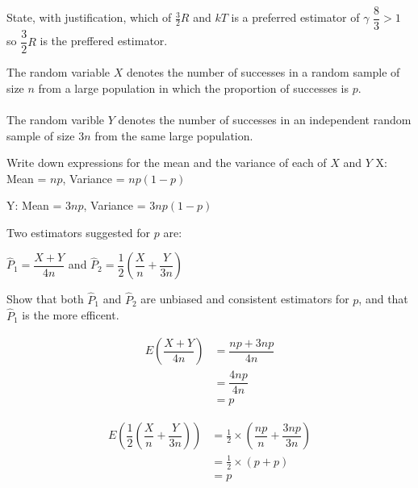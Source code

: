 \begin{example}
        \begin{step}{State, with justification, which of $\frac{3}{2}R$ and $kT$ is a preferred estimator of $\gamma$}
            $\dfrac{8}{3} > 1$ so $\dfrac{3}{2}R$ is the preffered estimator.
        \end{step}

    \end{example}

    \begin{example}
    {
        The random variable $X$ denotes the number of successes in a random sample of size $n$ from a large population in which the proportion of successes is $p$.
        \\\\
        The random varible $Y$ denotes the number of successes in an independent random sample of size $3n$ from the same large population.
    }

    \begin{step}{Write down expressions for the mean and the variance of each of $X$ and $Y$}
        X: Mean = $np$, Variance = $np(1-p)$

        Y: Mean = $3np$, Variance = $3np(1-p)$
    \end{step}

    \begin{step}
    {
        Two estimators suggested for $p$ are:
        \begin{center}
        $\hat{P}_1 = \dfrac{X + Y}{4n}$ and $\hat{P}_2 = \dfrac{1}{2}\left(\dfrac{X}{n} + \dfrac{Y}{3n}\right)$
        \end{center}
        Show that both $\hat{P}_1$ and $\hat{P}_2$ are unbiased and consistent estimators for $p$, and that $\hat{P}_1$ is the more efficent.
    }

    \begin{align*}
        E\left(\dfrac{X + Y}{4n}\right) &= \dfrac{np + 3np}{4n}     \\
        &= \dfrac{4np}{4n}                                          \\
        &= p
    \end{align*}
    
    \begin{align*}
        E\left(\dfrac{1}{2}\left(\dfrac{X}{n} + \dfrac{Y}{3n}\right)\right) &= \frac{1}{2} \times \left(\dfrac{np}{n}+\dfrac{3np}{3n}\right)    \\
        &= \frac{1}{2} \times (p + p) \\
        &= p
    \end{align*}


\end{step}
\end{example}
